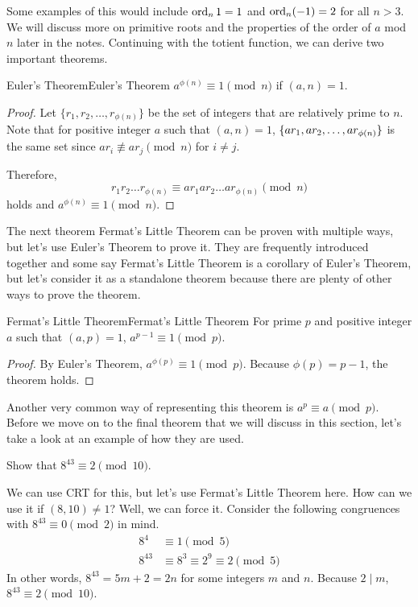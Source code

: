 \documentclass[../../../main.tex]{subfiles}
\begin{document}
Some examples of this would include $\operatorname{ord}_n 1 = 1$ and
$\operatorname{ord}_n (-1) = 2$ for all $n > 3$. We will discuss more on
primitive roots and the properties of the order of $a$ mod $n$
later in the notes. Continuing with the totient function,
we can derive two important theorems.

\begin{theorem}{Euler's Theorem}{Euler's Theorem}
$a^{\phi(n)} \equiv 1 \pmod{n}$ if $(a, n) = 1$.
\end{theorem}
\begin{proof}
Let $\{ r_1, r_2, \ldots, r_{\phi(n)} \}$ be the set of integers
that are relatively prime to $n$. Note that for positive integer $a$
such that $(a, n) = 1$, $\{ ar_1, ar_2, \ldots, \linebreak
ar_{\phi(n)} \}$ is the same set since $ar_i \not\equiv ar_j \pmod{n}$
for $i \neq j$.

Therefore,
\[
r_1 r_2 \ldots r_{\phi(n)}
\equiv ar_1 ar_2 \ldots ar_{\phi(n)} \pmod{n}
\]
holds and $a^{\phi(n)} \equiv 1 \pmod{n}$.
\end{proof}

The next theorem Fermat's Little Theorem can be proven with multiple
ways, but let's use Euler's Theorem to prove it. They are frequently
introduced together and some say Fermat's Little Theorem is a
corollary of Euler's Theorem, but let's consider it as a standalone
theorem because there are plenty of other ways to prove the theorem.

\begin{theorem}{Fermat's Little Theorem}{Fermat's Little Theorem}
For prime $p$ and positive integer $a$ such that $(a, p) = 1$,
$a^{p-1} \equiv 1 \pmod{p}$.
\end{theorem}
\begin{proof}
By Euler's Theorem, $a^{\phi(p)} \equiv 1 \pmod{p}$. Because
$\phi(p) = p - 1$, the theorem holds.
\end{proof}

Another very common way of representing this theorem is
$a^p \equiv a \pmod{p}$. Before we move on to the final theorem
that we will discuss in this section, let's take a look at an
example of how they are used.

\begin{problem}{}{}
Show that $8^{43} \equiv 2 \pmod{10}$.
\end{problem}
\begin{solution}
We can use CRT for this, but let's use Fermat's Little Theorem here.
How can we use it if $(8, 10) \neq 1$? Well, we can force it.
Consider the following congruences with $8^{43} \equiv 0 \pmod{2}$
in mind.
\begin{align*}
    8^4 &\equiv 1 \pmod{5} \\
    8^{43} &\equiv 8^3 \equiv 2^9 \equiv 2 \pmod{5}
\end{align*}
In other words, $8^{43} = 5m + 2 = 2n$ for some integers $m$ and $n$.
Because $2 \mid m$, $8^{43} \equiv 2 \pmod{10}$.
\end{solution}
\end{document}
